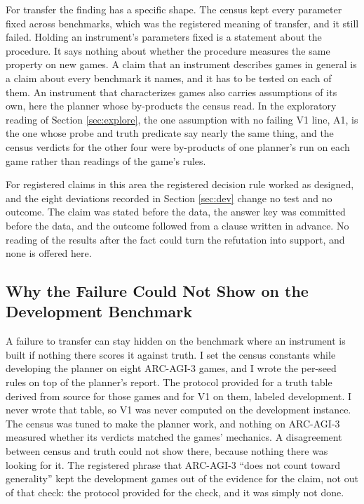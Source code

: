 \documentclass[twocolumn]{svjour3}
\begin{document}
For transfer the finding has a specific shape. The census kept every
parameter fixed across benchmarks, which was the registered meaning of
transfer, and it still failed. Holding an instrument's parameters fixed
is a statement about the procedure. It says nothing about whether the
procedure measures the same property on new games. A claim that an
instrument describes games in general is a claim about every benchmark
it names, and it has to be tested on each of them. An instrument that
characterizes games also carries assumptions of its own, here the
planner whose by-products the census read. In the exploratory reading of
Section \ref{sec:explore}, the one assumption with no failing V1 line,
A1, is the one whose probe and truth predicate say nearly the same
thing, and the census verdicts for the other four were by-products of
one planner's run on each game rather than readings of the game's rules.

For registered claims in this area the registered decision rule worked
as designed, and the eight deviations recorded in Section \ref{sec:dev}
change no test and no outcome. The claim was stated before the data, the
answer key was committed before the data, and the outcome followed from
a clause written in advance. No reading of the results after the fact
could turn the refutation into support, and none is offered here.

\subsection{Why the Failure Could Not Show on the Development
Benchmark}\label{sec:invisible}

A failure to transfer can stay hidden on the benchmark where an
instrument is built if nothing there scores it against truth. I set the
census constants while developing the planner on eight ARC-AGI-3 games,
and I wrote the per-seed rules on top of the planner's report. The
protocol provided for a truth table derived from source for those games
and for V1 on them, labeled development. I never wrote that table, so V1
was never computed on the development instance. The census was tuned to
make the planner work, and nothing on ARC-AGI-3 measured whether its
verdicts matched the games' mechanics. A disagreement between census and
truth could not show there, because nothing there was looking for it.
The registered phrase that ARC-AGI-3 ``does not count toward
generality'' kept the development games out of the evidence for the
claim, not out of that check: the protocol provided for the check, and
it was simply not done.
\end{document}
